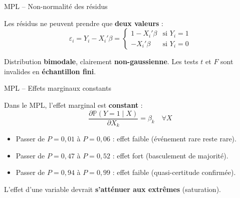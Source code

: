 \documentclass[11pt,aspectratio=169]{beamer}
\newcommand{\Prob}{\mathbb{P}}
\begin{document}
\begin{frame}{MPL -- Non-normalité des résidus}

Les résidus ne peuvent prendre que \textbf{deux valeurs} :
\[
\varepsilon_i = Y_i - X_i'\beta =
\begin{cases}
1 - X_i'\beta & \text{si } Y_i = 1 \\[6pt]
-X_i'\beta & \text{si } Y_i = 0
\end{cases}
\]

\begin{center}
\end{center}

Distribution \textbf{bimodale}, clairement \textbf{non-gaussienne}. Les tests $t$ et $F$ sont invalides en \textbf{échantillon fini}.

\end{frame}

\begin{frame}{MPL -- Effets marginaux constants}

Dans le MPL, l'effet marginal est \textbf{constant} :
\[
\frac{\partial \Prob(Y=1 \mid X)}{\partial X_k} = \beta_k \quad \forall X
\]

\vspace{0.3cm}

\begin{itemize}

\item Passer de $P = 0{,}01$ à $P = 0{,}06$ : effet faible (événement rare reste rare).\newline

\item Passer de $P = 0{,}47$ à $P = 0{,}52$ : effet fort (basculement de majorité).\newline

\item Passer de $P = 0{,}94$ à $P = 0{,}99$ : effet faible (quasi-certitude confirmée).

\end{itemize}

\vspace{0.3cm}

L'effet d'une variable devrait \textbf{s'atténuer aux extrêmes} (saturation).

\end{frame}
\end{document}

